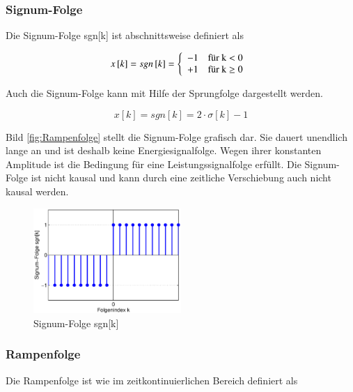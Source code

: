 \subsubsection{Signum-Folge}

\noindent Die Signum-Folge sgn[k] ist abschnittsweise definiert als

\begin{equation}\label{eq:threethirtyfive}
x\left[k\right]=sgn\left[k\right]=\left\{\begin{array}{l} {-{\rm 1}\quad \text{für k} <0} \\ 
{+1\quad \text{für k} \ge {\rm 0\; }} \end{array}\right.
\end{equation}

\noindent Auch die Signum-Folge kann mit Hilfe der Sprungfolge dargestellt werden.

\begin{equation}\label{eq:threethirtysix}
x\left[k\right]=sgn\left[k\right]=2\cdot \sigma \left[k\right]-1
\end{equation}

\noindent Bild \ref{fig:Rampenfolge} stellt die Signum-Folge grafisch dar. Sie dauert unendlich lange an und ist deshalb keine Energiesignalfolge. Wegen ihrer konstanten Amplitude ist die Bedingung f\"{u}r eine Leistungssignalfolge erf\"{u}llt. Die Signum-Folge ist nicht kausal und kann durch eine zeitliche Verschiebung auch nicht kausal werden.

\begin{figure}[H]
  \centerline{\includegraphics[width=0.5\textwidth]{Kapitel3/Bilder/image11.eps}}
  \caption{Signum-Folge sgn[k]}
  \label{fig:SignumFolge}
\end{figure}

\subsubsection{Rampenfolge}

\noindent Die Rampenfolge ist wie im zeitkontinuierlichen Bereich definiert als


